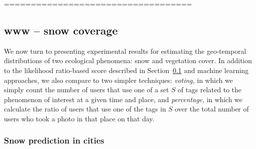 




\hfill \break
\hfill \break
===================================
\hfill \break
\hfill \break
\subsection{www -- snow coverage}

\label{sec:results}

We now turn to presenting experimental results for estimating the
geo-temporal distributions of two ecological phenomena: snow and vegetation cover.
In addition to the likelihood ratio-based score described in
Section~\ref{sec:results} and machine learning approaches, we also
compare to two simpler techniques: \textit{voting,} in which 
we simply count the number of users that use one of a set
$S$ of tags related to the phenomenon of interest at a given time and place, and
\textit{percentage,} in which we calculate the ratio of users that use
one of the tags in $S$ over the total number of users who took a photo
in that place on that day.

\subsubsection*{Snow prediction in cities}


